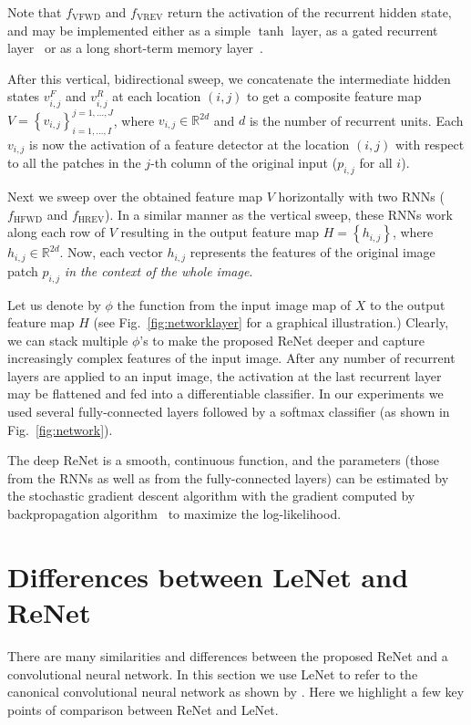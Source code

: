 \documentclass{article} \usepackage{nips15submit_e,times}
\newcommand{\RR}[0]{\mathbb{R}}
\begin{document}
Note that $f_{\text{VFWD}}$ and $f_{\text{VREV}}$ return the activation of the
recurrent hidden state, and may be implemented either as a simple $\tanh$ layer,
as a gated recurrent layer~\citep{Cho2014} or as a long short-term memory
layer~\citep{Hochreiter+Schmidhuber-1997}.

After this vertical, bidirectional sweep, we concatenate the intermediate hidden 
states $v^F_{i,j}$ and $v^R_{i,j}$ at each location $(i,j)$ to get a composite 
feature map $V= \left\{ v_{i,j} \right\}_{i=1,\ldots,I}^{j=1,\ldots,J}$, where 
$v_{i,j} \in \RR^{2d}$ and $d$ is the number of recurrent units.
Each $v_{i,j}$ is now the activation of a feature detector at the location
$(i,j)$ with respect to all the patches in the $j$-th column of the original
input ($p_{i, j}$ for all $i$).

Next we sweep over the obtained feature map $V$ horizontally with two RNNs
($f_{\text{HFWD}}$ and $f_{\text{HREV}}$).
In a similar manner as the vertical sweep, these RNNs work along each row 
of $V$ resulting in the output feature map $H = \left\{ h_{i,j} \right\}$, where
$h_{i,j} \in \RR^{2d}$. Now, each vector $h_{i,j}$ represents the features of
the original image patch $p_{i,j}$ \emph{in the context of the whole image}.

Let us denote by $\phi$ the function from the input image map of $X$ to
the output feature map $H$ (see Fig.~\ref{fig:networklayer} for a graphical
illustration.) Clearly, we can stack multiple $\phi$'s to make the
proposed ReNet deeper and capture increasingly complex features of the input
image. After any number of recurrent layers are applied to an input image,
the activation at the last recurrent layer may be flattened and fed into a
differentiable classifier. In our experiments we used several 
fully-connected layers followed by a softmax classifier (as shown in Fig.~\ref{fig:network}).

The deep ReNet is a smooth, continuous function, and the parameters (those from
the RNNs as well as from the fully-connected layers) can be estimated by the
stochastic gradient descent algorithm with the gradient computed by
backpropagation algorithm~\citep[see, e.g.,][]{BP86} to maximize the
log-likelihood.

\section{Differences between LeNet and ReNet}
\label{sec:lenetrenet}

There are many similarities and differences between the proposed ReNet and a
convolutional neural network. In this section we use LeNet to refer to the
canonical convolutional neural network as shown by \citet{LeCun89}. Here we
highlight a few key points of comparison between ReNet and LeNet.
\end{document}
